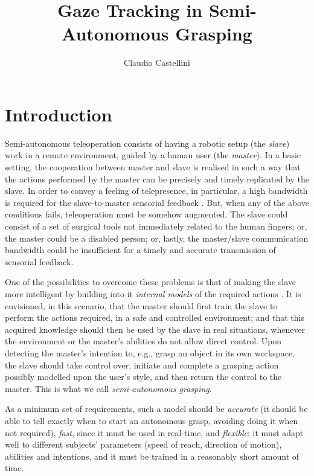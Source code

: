 \documentclass[jou,a4paper,notxfonts]{apa}
\title{Gaze Tracking in Semi-Autonomous Grasping}
\author{Claudio Castellini}
\affiliation{LIRA-Lab, University of Genova, Italy}
\begin{document}
\maketitle

\section{Introduction}

\label{sec:intro}

Semi-autonomous teleoperation consists of having a robotic setup (the
\emph{slave}) work in a remote environment, guided by a human user
(the \emph{master}). In a basic setting, the cooperation between
master and slave is realised in such a way that the actions performed
by the master can be precisely and timely replicated by the slave. In
order to convey a feeling of telepresence, in particular, a high
bandwidth is required for the slave-to-master sensorial feedback
\cite{telesensation}. But, when any of the above conditions fails,
teleoperation must be somehow augmented. The slave could consist of a
set of surgical tools \cite{okamura} not immediately related to the
human fingers; or, the master could be a disabled person; or, lastly,
the master/slave communication bandwidth could be insufficient for a
timely and accurate transmission of sensorial feedback.

One of the possibilities to overcome these problems is that of making
the slave more intelligent by building into it \emph{internal models}
of the required actions \cite{kawato-99}. It is envisioned, in this
scenario, that the master should first train the slave to perform the
actions required, in a safe and controlled environment; and that this
acquired knowledge should then be used by the slave in real
situations, whenever the environment or the master's abilities do not
allow direct control. Upon detecting the master's intention to, e.g.,
grasp an object in its own workspace, the slave should take control
over, initiate and complete a grasping action possibly modelled upon
the user's style, and then return the control to the master. This is
what we call \emph{semi-autonomous grasping}.

As a minimum set of requirements, such a model should be
\emph{accurate} (it should be able to tell exactly when to start an
autonomous grasp, avoiding doing it when not required), \emph{fast},
since it must be used in real-time, and \emph{flexible}: it must adapt
well to different subjects' parameters (speed of reach, direction of
motion), abilities and intentions, and it must be trained in a
reasonably short amount of time.
\end{document}

